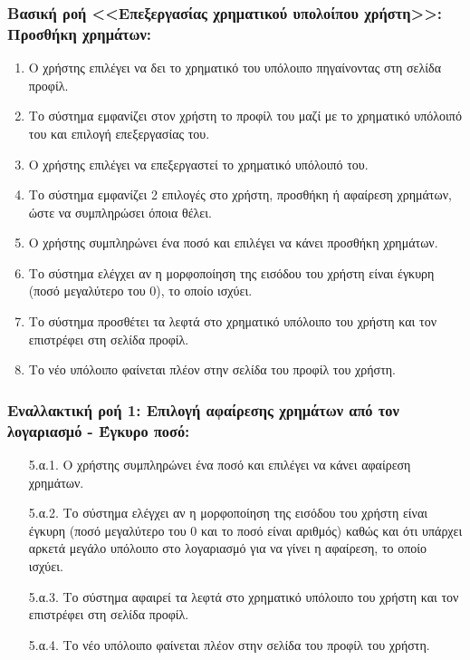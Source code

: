 \documentclass[12pt,a4paper]{article}
\begin{document}
\subsubsection*{Βασική ροή <<Επεξεργασίας χρηματικού υπολοίπου χρήστη>>: Προσθήκη χρημάτων:}
\begin{enumerate}
    \item Ο χρήστης επιλέγει να δει το χρηματικό του υπόλοιπο πηγαίνοντας στη σελίδα προφίλ.
    \item Το σύστημα εμφανίζει στον χρήστη το προφίλ του μαζί με το χρηματικό υπόλοιπό του και επιλογή επεξεργασίας του.
    \item Ο χρήστης επιλέγει να επεξεργαστεί το χρηματικό υπόλοιπό του.
    \item Το σύστημα εμφανίζει 2 επιλογές στο χρήστη, προσθήκη ή αφαίρεση χρημάτων, ώστε να συμπληρώσει όποια θέλει.
    \item Ο χρήστης συμπληρώνει ένα ποσό και επιλέγει να κάνει προσθήκη χρημάτων.
    \item Το σύστημα ελέγχει αν η μορφοποίηση της εισόδου του χρήστη είναι έγκυρη (ποσό μεγαλύτερο του 0), το οποίο ισχύει.
    \item Το σύστημα προσθέτει τα λεφτά στο χρηματικό υπόλοιπο του χρήστη και τον επιστρέφει στη σελίδα προφίλ.
    \item Το νέο υπόλοιπο φαίνεται πλέον στην σελίδα του προφίλ του χρήστη.
\end{enumerate}

\subsubsection*{Εναλλακτική ροή 1: Επιλογή αφαίρεσης χρημάτων από τον λογαριασμό - Έγκυρο ποσό:}
\begin{enumerate}
    \item [5.α.1.] Ο χρήστης συμπληρώνει ένα ποσό και επιλέγει να κάνει αφαίρεση χρημάτων.
    \item [5.α.2.] Το σύστημα ελέγχει αν η μορφοποίηση της εισόδου του χρήστη είναι έγκυρη (ποσό μεγαλύτερο του 0 και το ποσό είναι αριθμός) καθώς και ότι υπάρχει αρκετά μεγάλο υπόλοιπο στο λογαριασμό για να γίνει η αφαίρεση, το οποίο ισχύει.
    \item [5.α.3.] Το σύστημα αφαιρεί τα λεφτά στο χρηματικό υπόλοιπο του χρήστη και τον επιστρέφει στη σελίδα προφίλ.
    \item [5.α.4.] Το νέο υπόλοιπο φαίνεται πλέον στην σελίδα του προφίλ του χρήστη.
\end{enumerate}
\end{document}
